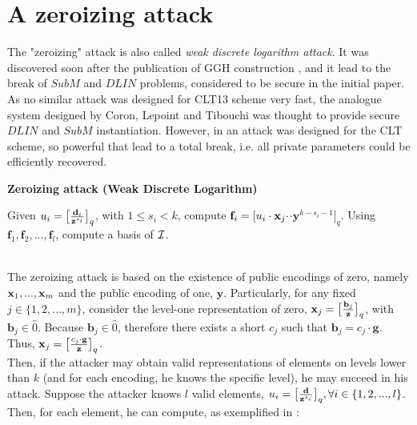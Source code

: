 \section{A zeroizing attack}

The "zeroizing" attack is also called \textit{weak discrete logarithm attack}. It was discovered soon after the publication of GGH construction \cite{GGH13}, and it lead to the break of $SubM$ and $DLIN$ problems, considered to be secure in the initial paper. As no similar attack was designed for CLT13 scheme \cite{CLT13} very fast, the analogue system designed by Coron, Lepoint and Tibouchi was thought to provide secure $DLIN$ and $SubM$ instantiation. However, in \cite{CKC+15} an attack was designed for the CLT scheme, so powerful that lead to a total break, i.e. all private parameters could be efficiently recovered.\\

\begin{tcolorbox}[colframe=black,colback=white,arc=0pt,outer arc=0pt]
	\begin{center}
		\textbf{Zeroizing attack (Weak Discrete Logarithm)}
	\end{center}
	\begin{algorithmic}[1]
		\State Given $u_i = \big[ \frac{\textbf{d}_i}{\textbf{z}^{s_i}} \big]_q$, with $1 \leq s_i < k$, compute $\textbf{f}_i = [u_i \cdot \textbf{x}_j \cdot$\pzt$\cdot \textbf{y}^{k - s_i - 1}]_q$.
		\EndFor
		\State Using $\textbf{f}_1, \textbf{f}_2, ..., \textbf{f}_l$, compute a basis of $\mathcal{I}$.
	\end{algorithmic}
\end{tcolorbox}
~\\
The zeroizing attack is based on the existence of public encodings of zero, namely $\textbf{x}_1,..., \textbf{x}_m$ and the public encoding of one, $\textbf{y}$. Particularly, for any fixed $j \in \{1,2,...,m\}$, consider the level-one representation of zero, $\textbf{x}_j = \big[ \frac{\textbf{b}_j}{\textbf{z}} \big]_q$, with $\textbf{b}_j \in \hat{0}$. Because $\textbf{b}_j \in \hat{0}$, therefore there exists a short $c_j$ such that $\textbf{b}_j = c_j \cdot \textbf{g}$. Thus, $\textbf{x}_j = \big[ \frac{c_j \cdot \textbf{g}}{\textbf{z}} \big]_q$.\\

Then, if the attacker may obtain valid representations of elements on levels lower than $k$ (and for each encoding, he knows the specific level), he may succeed in his attack. Suppose the attacker knows $l$ valid elements, $u_i = \big[ \frac{\textbf{d}}{\textbf{z}^{s_i}} \big]_q, \forall i \in \{1,2,...,l\}$. Then, for each element, he can compute, as exemplified in \cite{Gar15}:

